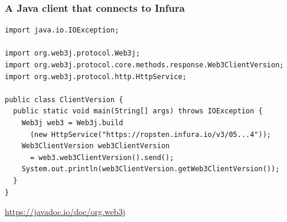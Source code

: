 \documentclass[11pt]{beamer}  %
\begin{document}
\begin{frame}[fragile]\frametitle{A Java client that connects to Infura}

{\small\begin{verbatim}
import java.io.IOException;

import org.web3j.protocol.Web3j;
import org.web3j.protocol.core.methods.response.Web3ClientVersion;
import org.web3j.protocol.http.HttpService;

public class ClientVersion {
  public static void main(String[] args) throws IOException {
    Web3j web3 = Web3j.build
      (new HttpService("https://ropsten.infura.io/v3/05...4"));
    Web3ClientVersion web3ClientVersion
      = web3.web3ClientVersion().send();
    System.out.println(web3ClientVersion.getWeb3ClientVersion());
  }
}
\end{verbatim}}

  \bigskip

  \url{https://javadoc.io/doc/org.web3j}

\end{frame}
\end{document}
